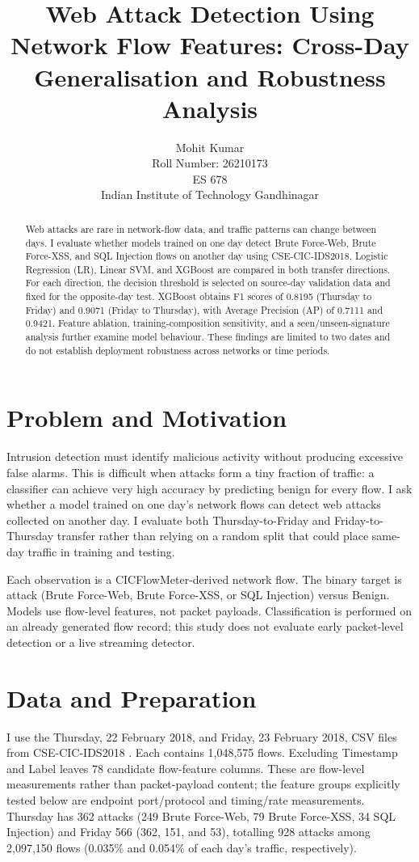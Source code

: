 \documentclass{article}
\title{Web Attack Detection Using Network Flow Features: Cross-Day Generalisation and Robustness Analysis}
\author{%
  Mohit Kumar \\
  Roll Number: 26210173 \\
  ES 678 \\
  Indian Institute of Technology Gandhinagar
}
\begin{document}
\maketitle

\begin{abstract}
Web attacks are rare in network-flow data, and traffic patterns can change between days. I evaluate whether models trained on one day detect Brute Force-Web, Brute Force-XSS, and SQL Injection flows on another day using CSE-CIC-IDS2018. Logistic Regression (LR), Linear SVM, and XGBoost are compared in both transfer directions. For each direction, the decision threshold is selected on source-day validation data and fixed for the opposite-day test. XGBoost obtains F1 scores of 0.8195 (Thursday to Friday) and 0.9071 (Friday to Thursday), with Average Precision (AP) of 0.7111 and 0.9421. Feature ablation, training-composition sensitivity, and a seen/unseen-signature analysis further examine model behaviour. These findings are limited to two dates and do not establish deployment robustness across networks or time periods.
\end{abstract}

\section{Problem and Motivation}
Intrusion detection must identify malicious activity without producing excessive false alarms. This is difficult when attacks form a tiny fraction of traffic: a classifier can achieve very high accuracy by predicting benign for every flow. I ask whether a model trained on one day's network flows can detect web attacks collected on another day. I evaluate both Thursday-to-Friday and Friday-to-Thursday transfer rather than relying on a random split that could place same-day traffic in training and testing.

Each observation is a CICFlowMeter-derived network flow. The binary target is attack (Brute Force-Web, Brute Force-XSS, or SQL Injection) versus Benign. Models use flow-level features, not packet payloads. Classification is performed on an already generated flow record; this study does not evaluate early packet-level detection or a live streaming detector.

\section{Data and Preparation}
I use the Thursday, 22 February 2018, and Friday, 23 February 2018, CSV files from CSE-CIC-IDS2018 \cite{sharafaldin2018,cseids2018}. Each contains 1,048,575 flows. Excluding Timestamp and Label leaves 78 candidate flow-feature columns. These are flow-level measurements rather than packet-payload content; the feature groups explicitly tested below are endpoint port/protocol and timing/rate measurements. Thursday has 362 attacks (249 Brute Force-Web, 79 Brute Force-XSS, 34 SQL Injection) and Friday 566 (362, 151, and 53), totalling 928 attacks among 2,097,150 flows (0.035\% and 0.054\% of each day's traffic, respectively).
\end{document}
